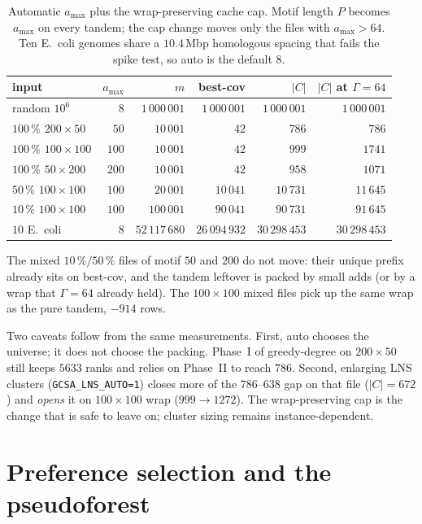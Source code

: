 \documentclass[11pt,a4paper]{article}
\theoremstyle{definition}
\theoremstyle{plain}
\theoremstyle{remark}
\begin{document}
\begin{table}[ht]
\centering
\small
\begin{tabular}{@{}lrrrrr@{}}
\toprule
input & $a_{\max}$ & $m$ & best-cov & $|C|$ & $|C|$ at $\Gamma=64$ \\
\midrule
random $10^6$     & $8$  & $1\,000\,001$ & $1\,000\,001$ & $1\,000\,001$ & $1\,000\,001$ \\
$100\,\%$ $200\times 50$ & $50$  & $10\,001$ & $42$ & $786$ & $786$ \\
$100\,\%$ $100\times 100$ & $100$ & $10\,001$ & $42$ & $999$ & $1741$ \\
$100\,\%$ $50\times 200$  & $200$ & $10\,001$ & $42$ & $958$ & $1071$ \\
$50\,\%$ $100\times 100$  & $100$ & $20\,001$ & $10\,041$ & $10\,731$ & $11\,645$ \\
$10\,\%$ $100\times 100$  & $100$ & $100\,001$ & $90\,041$ & $90\,731$ & $91\,645$ \\
$10$ E.\ coli            & $8$  & $52\,117\,680$ & $26\,094\,932$ & $30\,298\,453$ & $30\,298\,453$ \\
\bottomrule
\end{tabular}
\caption{Automatic $a_{\max}$ plus the wrap-preserving cache cap.
  Motif length $P$ becomes $a_{\max}$ on every tandem; the cap change
  moves only the files with $a_{\max}>64$. Ten E.\ coli genomes share
  a $10.4$\,Mbp homologous spacing that fails the spike test, so
  auto is the default $8$.}
\label{tab:auto}
\end{table}

The mixed $10\,\%/50\,\%$ files of motif $50$ and $200$ do not move:
their unique prefix already sits on best-cov, and the tandem leftover
is packed by small adds (or by a wrap that $\Gamma=64$ already held).
The $100\times 100$ mixed files pick up the same wrap as the pure
tandem, $-914$ rows.

Two caveats follow from the same measurements. First, auto chooses the
universe; it does not choose the packing. Phase~I of greedy-degree on
$200\times 50$ still keeps $5633$ ranks and relies on Phase~II to
reach $786$. Second, enlarging LNS clusters
(\texttt{GCSA\_LNS\_AUTO=1}) closes more of the $786$--$638$ gap on
that file ($|C|=672$) and \emph{opens} it on $100\times 100$ wrap
($999\to 1272$). The wrap-preserving cap is the change that is safe
to leave on; cluster sizing remains instance-dependent.

\section{Preference selection and the pseudoforest}
\label{sec:pref}
\end{document}
